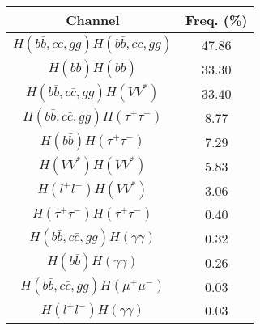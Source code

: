 \begin{tabular}{c|c}
Channel & Freq. (\%) \\
\hline
$H(b\bar{b},c\bar{c},gg)H(b\bar{b},c\bar{c},gg)$ & 47.86 \\
\hline
$H(b\bar{b})H(b\bar{b})$ & 33.30 \\
\hline
$H(b\bar{b},c\bar{c},gg)H(VV^{*})$ & 33.40 \\
\hline
$H(b\bar{b},c\bar{c},gg)H(\tau^{+}\tau^{-})$ & 8.77    \\
\hline
$H(b\bar{b})H(\tau^{+}\tau^{-})$ & 7.29    \\
\hline
$H(VV^*)H(VV^{*})$ & 5.83  \\
\hline
$H(l^{+}l^{-})H(VV^{*})$ & 3.06   \\
\hline
$H(\tau^{+}\tau^{-})H(\tau^{+}\tau^{-})$ & 0.40 \\
\hline
$H(b\bar{b},c\bar{c},gg)H(\gamma\gamma)$ & 0.32   \\
\hline
$H(b\bar{b})H(\gamma\gamma)$ & 0.26   \\
\hline
$H(b\bar{b},c\bar{c},gg)H(\mu^{+}\mu^{-})$ & 0.03   \\
\hline
$H(l^{+}l^{-})H(\gamma\gamma)$ & 0.03   \\
\hline
\end{tabular}
